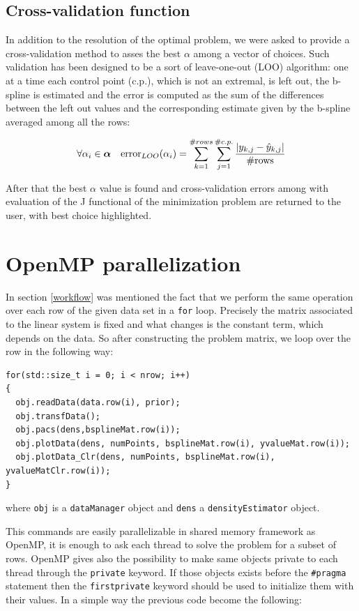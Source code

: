 \subsection{Cross-validation function} \label{cv}
In addition to the resolution of the optimal problem, we were asked to provide a cross-validation method to asses the best $\alpha$ among a vector of choices. Such validation has been designed to be a sort of leave-one-out (LOO) algorithm: one at a time each control point (c.p.), which is not an extremal, is left out, the b-spline is estimated and the error is computed as the sum of the differences between the left out values and the corresponding estimate given by the b-spline averaged among all the rows:

\[ \forall \alpha_{i}\in\bm{\alpha}  \quad \text{error}_{LOO}(\alpha_{i}) = \sum_{k=1}^{\#rows}\sum_{j=1}^{\#c.p.} \frac{\\| y_{k,j}-\hat{y}_{k,j} \\| }{\text{\#rows}} \]

After that the best $\alpha$ value is found and cross-validation errors among with evaluation of the J functional of the minimization problem are returned to the user, with best choice highlighted.

\section{OpenMP parallelization} \label{openmp}
In section \ref{workflow} was mentioned the fact that we perform the same operation over each row of the given data set in a \verb|for| loop. Precisely the matrix associated to the linear system is fixed and what changes is the constant term, which depends on the data. So after constructing the problem matrix, we loop over the row in the following way:

\begin{lstlisting}
for(std::size_t i = 0; i < nrow; i++)
{
  obj.readData(data.row(i), prior);
  obj.transfData();
  obj.pacs(dens,bsplineMat.row(i));
  obj.plotData(dens, numPoints, bsplineMat.row(i), yvalueMat.row(i));
  obj.plotData_Clr(dens, numPoints, bsplineMat.row(i), yvalueMatClr.row(i));
}
\end{lstlisting}

where \verb|obj| is a \verb|dataManager| object and \verb|dens| a \verb|densityEstimator| object.

This commands are easily parallelizable in shared memory framework as OpenMP, it is enough to ask each thread to solve the problem for a subset of rows. OpenMP gives also the possibility to make same objects private to each thread through the \verb|private| keyword. If those objects exists before the \verb|#pragma| statement then the \verb|firstprivate| keyword should be used to initialize them with their values. In a simple way the previous code become the following:

